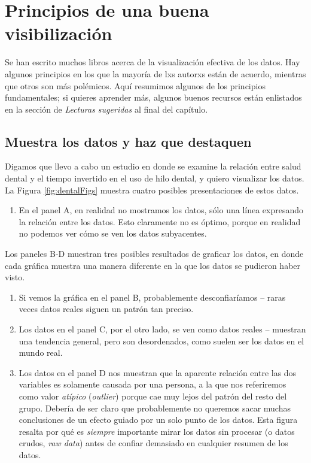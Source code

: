 \documentclass[
  12pt,
]{book}
\providecommand{\tightlist}{%
  \setlength{\itemsep}{0pt}\setlength{\parskip}{0pt}}
\begin{document}
\hypertarget{principios-de-una-buena-visibilizaciuxf3n}{%
\section{Principios de una buena visibilización}\label{principios-de-una-buena-visibilizaciuxf3n}}

Se han escrito muchos libros acerca de la visualización efectiva de los datos. Hay algunos principios en los que la mayoría de lxs autorxs están de acuerdo, mientras que otros son más polémicos. Aquí resumimos algunos de los principios fundamentales; si quieres aprender más, algunos buenos recursos están enlistados en la sección de \emph{Lecturas sugeridas} al final del capítulo.

\hypertarget{muestra-los-datos-y-haz-que-destaquen}{%
\subsection{Muestra los datos y haz que destaquen}\label{muestra-los-datos-y-haz-que-destaquen}}

Digamos que llevo a cabo un estudio en donde se examine la relación entre salud dental y el tiempo invertido en el uso de hilo dental, y quiero visualizar los datos. La Figura \ref{fig:dentalFigs} muestra cuatro posibles presentaciones de estos datos.

\begin{enumerate}
\def\labelenumi{\arabic{enumi}.}
\tightlist
\item
  En el panel A, en realidad no mostramos los datos, sólo una línea expresando la relación entre los datos. Esto claramente no es óptimo, porque en realidad no podemos ver cómo se ven los datos subyacentes.
\end{enumerate}

Los paneles B-D muestran tres posibles resultados de graficar los datos, en donde cada gráfica muestra una manera diferente en la que los datos se pudieron haber visto.

\begin{enumerate}
\def\labelenumi{\arabic{enumi}.}
\setcounter{enumi}{1}
\tightlist
\item
  Si vemos la gráfica en el panel B, probablemente desconfiaríamos -- raras veces datos reales siguen un patrón tan preciso.
\item
  Los datos en el panel C, por el otro lado, se ven como datos reales -- muestran una tendencia general, pero son desordenados, como suelen ser los datos en el mundo real.
\item
  Los datos en el panel D nos muestran que la aparente relación entre las dos variables es solamente causada por una persona, a la que nos referiremos como valor \emph{atípico} (\emph{outlier}) porque cae muy lejos del patrón del resto del grupo. Debería de ser claro que probablemente no queremos sacar muchas conclusiones de un efecto guiado por un solo punto de los datos. Esta figura resalta por qué es \emph{siempre} importante mirar los datos sin procesar (o datos crudos, \emph{raw data}) antes de confiar demasiado en cualquier resumen de los datos.
\end{enumerate}
\end{document}
